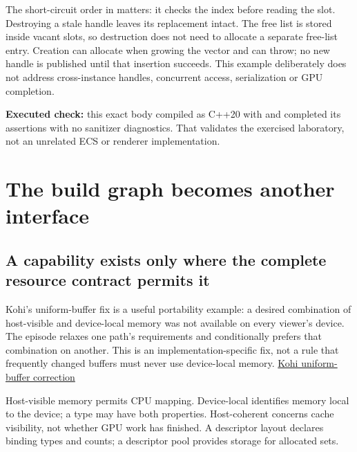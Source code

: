 The short-circuit order in  matters: it checks the index before reading the slot. Destroying a stale handle leaves its replacement intact. The free list is stored inside vacant slots, so destruction does not need to allocate a separate free-list entry. Creation can allocate when growing the vector and can throw; no new handle is published until that insertion succeeds. This example deliberately does not address cross-instance handles, concurrent access, serialization or GPU completion.

\textbf{Executed check:} this exact body compiled as C++20 with  and completed its assertions with no sanitizer diagnostics. That validates the exercised laboratory, not an unrelated ECS or renderer implementation.

\section{The build graph becomes another interface}\label{01-foundations-i-ch008-the-build-graph-becomes-another-interface}

\hypertarget{01-foundations-i-ch008-the-build-graph-becomes-another-interface}{}

\subsection{A capability exists only where the complete resource contract permits it}\label{01-foundations-i-ch008-a-capability-exists-only-where-the-complete-resource-contract-permits-it}

\hypertarget{01-foundations-i-ch008-a-capability-exists-only-where-the-complete-resource-contract-permits-it}{}

Kohi's uniform-buffer fix is a useful portability example: a desired combination of host-visible and device-local memory was not available on every viewer's device. The episode relaxes one path's requirements and conditionally prefers that combination on another. This is an implementation-specific fix, not a rule that frequently changed buffers must never use device-local memory. \href{https://www.youtube.com/watch?v=aD6fZ7tQSAY}{Kohi uniform-buffer correction}

Host-visible memory permits CPU mapping. Device-local identifies memory local to the device; a type may have both properties. Host-coherent concerns cache visibility, not whether GPU work has finished. A descriptor layout declares binding types and counts; a descriptor pool provides storage for allocated sets.

